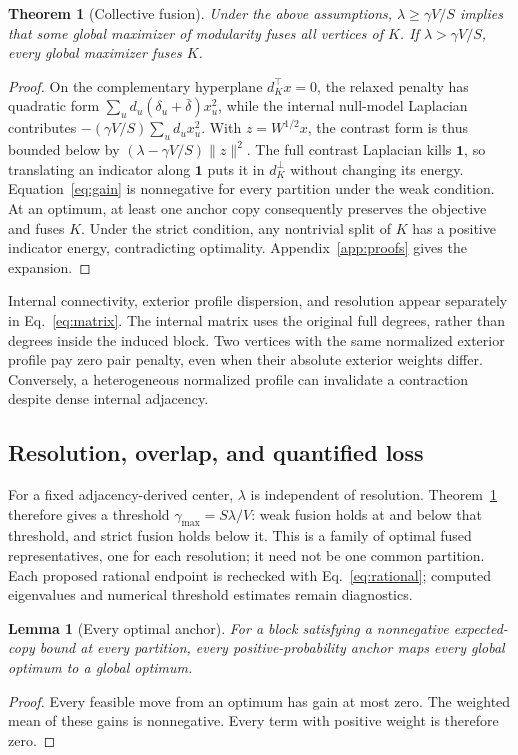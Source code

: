 \documentclass[sigconf,anonymous,review]{acmart}
\newtheorem{theorem}{Theorem}
\newtheorem{lemma}{Lemma}
\newcommand{\1}{\mathbf{1}}
\begin{document}
\begin{theorem}[Collective fusion]\label{thm:fusion}
Under the above assumptions, $\lambda\geq\gamma V/S$ implies that some global
maximizer of modularity fuses all vertices of $K$. If
$\lambda>\gamma V/S$, every global maximizer fuses $K$.
\end{theorem}
\begin{proof}
On the complementary hyperplane $d_K^\top x=0$, the relaxed penalty has
quadratic form $\sum_u d_u(\delta_u+\bar\delta)x_u^2$, while the internal
null-model Laplacian contributes $-(\gamma V/S)\sum_u d_u x_u^2$.
With $z=W^{1/2}x$, the contrast form is thus bounded below by
$(\lambda-\gamma V/S)\|z\|^2$.
The full contrast Laplacian kills $\1$, so translating an indicator along
$\1$ puts it in $d_K^\perp$ without changing its energy. Equation~\eqref{eq:gain}
is nonnegative for every partition under the weak condition. At an optimum,
at least one anchor copy consequently preserves the objective and fuses $K$.
Under the strict condition, any nontrivial split of $K$ has a positive indicator
energy, contradicting optimality. Appendix~\ref{app:proofs} gives the expansion.
\end{proof}

Internal connectivity, exterior profile dispersion, and resolution appear
separately in Eq.~\eqref{eq:matrix}. The internal matrix uses the original full
degrees, rather than degrees inside the induced block. Two vertices with the
same normalized exterior profile pay zero pair penalty, even when their
absolute exterior weights differ. Conversely, a heterogeneous normalized
profile can invalidate a contraction despite dense internal adjacency.

\subsection{Resolution, overlap, and quantified loss}
For a fixed adjacency-derived center, $\lambda$ is independent of resolution.
Theorem~\ref{thm:fusion} therefore gives a threshold
$\gamma_{\max}=S\lambda/V$: weak fusion holds at and below that threshold,
and strict fusion holds below it. This is a family of optimal fused
representatives, one for each resolution; it need not be one common partition.
Each proposed rational endpoint is rechecked with Eq.~\eqref{eq:rational};
computed eigenvalues and numerical threshold estimates remain diagnostics.

\begin{lemma}[Every optimal anchor]\label{lem:anchor}
For a block satisfying a nonnegative expected-copy bound at every partition,
every positive-probability anchor maps every global optimum to a global optimum.
\end{lemma}
\begin{proof}
Every feasible move from an optimum has gain at most zero. The weighted mean of
these gains is nonnegative. Every term with positive weight is therefore zero.
\end{proof}
\end{document}
